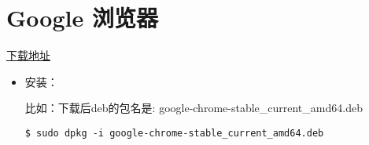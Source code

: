 \section{Google 浏览器}
\href{https://www.google.cn/chrome/index.html}{下载地址}
\begin{itemize}
\item 安装：

比如：下载后deb的包名是: google-chrome-stable\_current\_amd64.deb
\begin{lstlisting}
$ sudo dpkg -i google-chrome-stable_current_amd64.deb
\end{lstlisting}
\end{itemize}